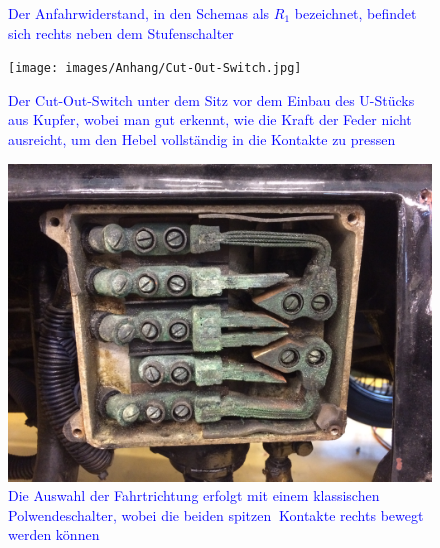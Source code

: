 \begin{landscape}
\begin{figure}[h]
	\caption{\textcolor{blue}{Der Anfahrwiderstand, in den Schemas als $R_1$ bezeichnet, befindet sich rechts neben dem Stufenschalter}}
	\label{fig:Anfahrwiderstand}
\end{figure}
\begin{figure}[h]
	\centering
		\texttt{[image: images/Anhang/Cut-Out-Switch.jpg]}
	\caption{\textcolor{blue}{Der Cut-Out-Switch unter dem Sitz vor dem Einbau des U-Stücks aus Kupfer, wobei man gut erkennt, wie die Kraft der Feder nicht ausreicht, um den Hebel vollständig in die Kontakte zu pressen}}
	\label{fig:Cut-Out-Switch}
\end{figure}
\begin{figure}[h]
	\centering
		\includegraphics[width=1.30\textwidth]{images/Anhang/Fahrtrichtung.jpg}
	\caption{\textcolor{blue}{Die Auswahl der Fahrtrichtung erfolgt mit einem klassischen Polwendeschalter, wobei die beiden \grqq spitzen\grqq$~$ Kontakte rechts bewegt werden können}}
	\label{fig:Fahrtrichtung}
\end{figure}
\begin{figure}[h]
	\centering

\end{figure}
\end{landscape}
